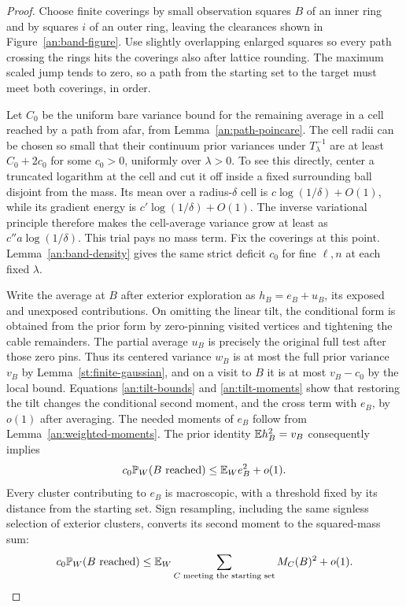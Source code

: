 \begin{proof}
Choose finite coverings by small observation squares $B$ of an
inner ring and by squares $i$ of an outer ring, leaving the
clearances shown in Figure~\ref{an:band-figure}.  Use slightly
overlapping enlarged squares so every path crossing the rings
hits the coverings also after lattice rounding.  The maximum
scaled jump tends to zero, so a path from the starting set to the
target must meet both coverings, in order.

Let $C_0$ be the uniform bare variance bound for the remaining
average in a cell reached by a path from afar, from
Lemma~\ref{an:path-poincare}.  The cell radii can be chosen so
small that their continuum prior variances under $T_\lambda^{-1}$
are at least $C_0+2c_0$ for some $c_0>0$, uniformly over
$\lambda>0$.  To see this directly, center a truncated logarithm
at the cell and cut it off inside a fixed surrounding ball
disjoint from the mass.  Its mean over a radius-$\delta$ cell is
$c\log(1/\delta)+O(1)$, while its gradient energy is
$c'\log(1/\delta)+O(1)$.  The inverse variational principle
therefore makes the cell-average variance grow at least as
$c''a\log(1/\delta)$.  This trial pays no mass term.  Fix the
coverings at this point.  Lemma~\ref{an:band-density} gives the
same strict deficit $c_0$ for fine $\ell,n$ at each fixed
$\lambda$.

Write the average at $B$ after exterior exploration as
$h_B=e_B+u_B$, its exposed and unexposed contributions.  On
omitting the linear tilt, the conditional form is obtained from
the prior form by zero-pinning visited vertices and tightening
the cable remainders.  The partial average $u_B$ is precisely
the original full test after those zero pins.  Thus its centered
variance $w_B$ is at most the full prior variance $v_B$ by
Lemma~\ref{st:finite-gaussian}, and on a visit to $B$ it is at
most $v_B-c_0$ by the local bound.  Equations
\eqref{an:tilt-bounds} and \eqref{an:tilt-moments} show that
restoring the tilt changes the conditional second moment, and
the cross term with $e_B$, by $o(1)$ after averaging.  The needed
moments of $e_B$ follow from Lemma~\ref{an:weighted-moments}.
The prior identity $\mathbb E h_B^2=v_B$ consequently implies
\[
 c_0\mathbb P_W(B\text{ reached})\le\mathbb E_We_B^2+o(1).
\]
Every cluster contributing to $e_B$ is macroscopic, with a
threshold fixed by its distance from the starting set.  Sign
resampling, including the same signless selection of exterior
clusters, converts its second moment to the squared-mass sum:
\begin{equation}
 c_0\mathbb P_W(B\text{ reached})
 \le\mathbb E_W\sum_{C\text{ meeting the starting set}}M_C(B)^2+o(1).
 \label{an:exterior-deficit}
\end{equation}


\end{proof}

